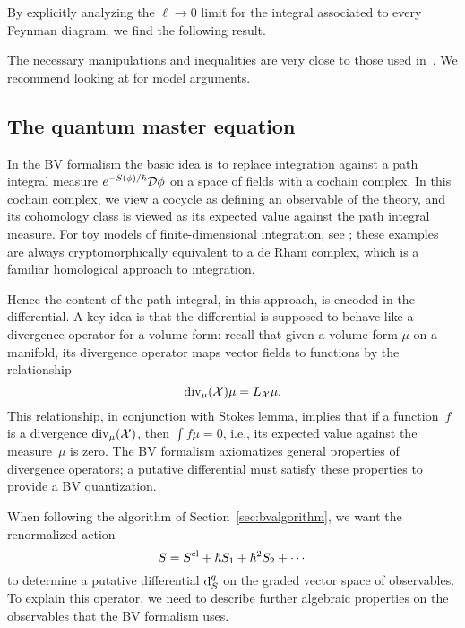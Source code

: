 By explicitly analyzing the $\ell \to 0$ limit for the integral associated to every Feynman diagram,
we find the following result.

\begin{prop}
\end{prop}

The necessary manipulations and inequalities are very close to those used in~\cite{}.
We recommend looking at  for model arguments.


\subsection{The quantum master equation}

In the BV formalism the basic idea is to replace integration against a path integral measure $e^{-S(\phi)/\hbar} \mathcal D \phi$ on a space of fields with a cochain complex.
In this cochain complex, we view a cocycle as defining an observable of the theory,
and its cohomology class is viewed as its expected value against the path integral measure.
For toy models of finite-dimensional integration, see \cite{};
these examples are always cryptomorphically equivalent to a de Rham complex,
which is a familiar homological approach to integration.

Hence the content of the path integral, in this approach, is encoded in the differential. 
A key idea is that the differential is supposed to behave like a divergence operator for a volume form:
recall that given a volume form $\mu$ on a manifold, 
its divergence operator maps vector fields to functions by the relationship
\[
{\rm div}_\mu({\mathcal X}) \mu = L_{\mathcal X} \mu.
\] 
This relationship, in conjunction with Stokes lemma, 
implies that if a function~$f$ is a divergence ${\rm div}_\mu({\mathcal X})$,
then $\int f \mu = 0$,
i.e., its expected value against the measure~$\mu$ is zero.
The BV formalism axiomatizes general properties of divergence operators;
a putative differential must satisfy these properties to provide a BV quantization.

When following the algorithm of Section~\ref{sec:bvalgorithm},
we want the renormalized action
\[
S = S^{\rm cl} + \hbar S_1 + \hbar^2 S_2 + \cdots
\]
to determine a putative differential ${\rm d}^q_S$ on the graded vector space of observables.
To explain this operator, we need to describe further algebraic properties on the observables
that the BV formalism uses.

